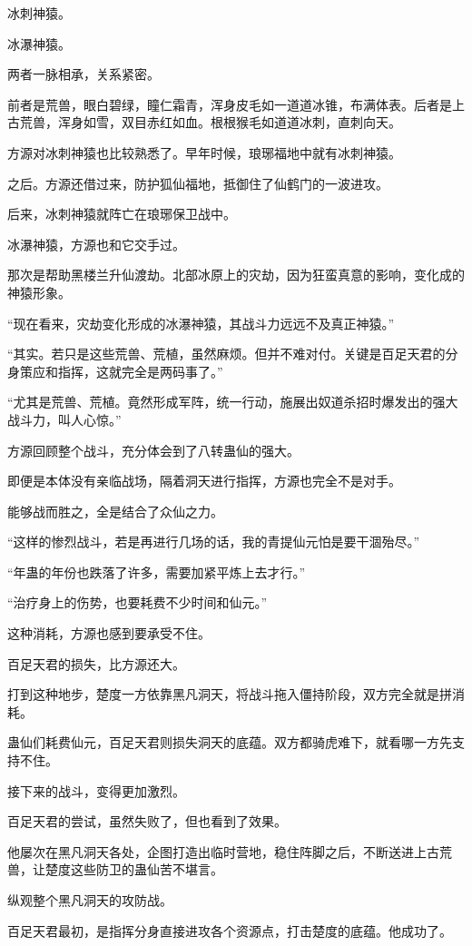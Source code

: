 \begin{this_body}
冰刺神猿。

冰瀑神猿。

两者一脉相承，关系紧密。

前者是荒兽，眼白碧绿，瞳仁霜青，浑身皮毛如一道道冰锥，布满体表。后者是上古荒兽，浑身如雪，双目赤红如血。根根猴毛如道道冰刺，直刺向天。

方源对冰刺神猿也比较熟悉了。早年时候，琅琊福地中就有冰刺神猿。

之后。方源还借过来，防护狐仙福地，抵御住了仙鹤门的一波进攻。

后来，冰刺神猿就阵亡在琅琊保卫战中。

冰瀑神猿，方源也和它交手过。

那次是帮助黑楼兰升仙渡劫。北部冰原上的灾劫，因为狂蛮真意的影响，变化成的神猿形象。

“现在看来，灾劫变化形成的冰瀑神猿，其战斗力远远不及真正神猿。”

“其实。若只是这些荒兽、荒植，虽然麻烦。但并不难对付。关键是百足天君的分身策应和指挥，这就完全是两码事了。”

“尤其是荒兽、荒植。竟然形成军阵，统一行动，施展出奴道杀招时爆发出的强大战斗力，叫人心惊。”

方源回顾整个战斗，充分体会到了八转蛊仙的强大。

即便是本体没有亲临战场，隔着洞天进行指挥，方源也完全不是对手。

能够战而胜之，全是结合了众仙之力。

“这样的惨烈战斗，若是再进行几场的话，我的青提仙元怕是要干涸殆尽。”

“年蛊的年份也跌落了许多，需要加紧平炼上去才行。”

“治疗身上的伤势，也要耗费不少时间和仙元。”

这种消耗，方源也感到要承受不住。

百足天君的损失，比方源还大。

打到这种地步，楚度一方依靠黑凡洞天，将战斗拖入僵持阶段，双方完全就是拼消耗。

蛊仙们耗费仙元，百足天君则损失洞天的底蕴。双方都骑虎难下，就看哪一方先支持不住。

接下来的战斗，变得更加激烈。

百足天君的尝试，虽然失败了，但也看到了效果。

他屡次在黑凡洞天各处，企图打造出临时营地，稳住阵脚之后，不断送进上古荒兽，让楚度这些防卫的蛊仙苦不堪言。

纵观整个黑凡洞天的攻防战。

百足天君最初，是指挥分身直接进攻各个资源点，打击楚度的底蕴。他成功了。


\end{this_body}
